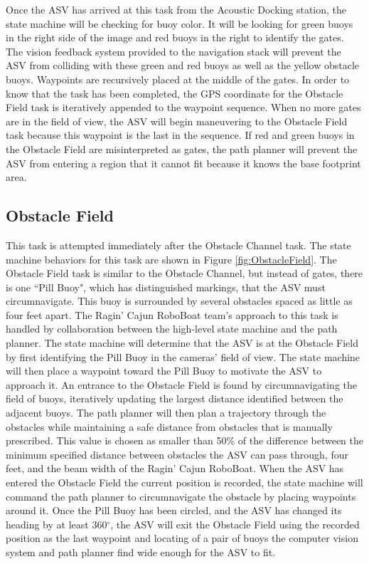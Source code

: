 \documentclass[letterpaper, 12 pt, conference]{ieeeconf}
\begin{document}
Once the ASV has arrived at this task from the Acoustic Docking station, the state machine will be checking for buoy color. It will be looking for green buoys in the right side of the image and red buoys in the right to identify the gates. The vision feedback system provided to the navigation stack will prevent the ASV from colliding with these green and red buoys as well as the yellow obstacle buoys. Waypoints are recursively placed at the middle of the gates. In order to know that the task has been completed, the GPS coordinate for the Obstacle Field task is iteratively appended to the waypoint sequence. When no more gates are in the field of view, the ASV will begin maneuvering to the Obstacle Field task because this waypoint is the last in the sequence. If red and green buoys in the Obstacle Field are misinterpreted as gates, the path planner will prevent the ASV from entering a region that it cannot fit because it knows the base footprint area.

\subsection{Obstacle Field}
\label{ObstacleField}
This task is attempted immediately after the Obstacle Channel task. The state machine behaviors for this task are shown in Figure \ref{fig:ObstacleField}. The Obstacle Field task is similar to the Obstacle Channel, but instead of gates, there is one ``Pill Buoy", which has distinguished markings, that the ASV must circumnavigate. This buoy is surrounded by several obstacles spaced as little as four feet apart. The Ragin' Cajun RoboBoat team's approach to this task is handled by collaboration between the high-level state machine and the path planner. The state machine will determine that the ASV is at the Obstacle Field by first identifying the Pill Buoy in the cameras' field of view. The state machine will then place a waypoint toward the Pill Buoy to motivate the ASV to approach it. An entrance to the Obstacle Field is found by circumnavigating the field of buoys, iteratively updating the largest distance identified between the adjacent buoys. The path planner will then plan a trajectory through the obstacles while maintaining a safe distance from obstacles that is manually prescribed. This value is chosen as smaller than 50\% of the difference between the minimum specified distance between obstacles the ASV can pass through, four feet, and the beam width of the Ragin' Cajun RoboBoat. When the ASV has entered the Obstacle Field the current position is recorded, the state machine will command the path planner to circumnavigate the obstacle by placing waypoints around it. Once the Pill Buoy has been circled, and the ASV has changed its heading by at least 360$^\circ$, the ASV will exit the Obstacle Field using the recorded position as the last waypoint  and locating of a pair of buoys the computer vision system and path planner find wide enough for the ASV to fit.
\end{document}
